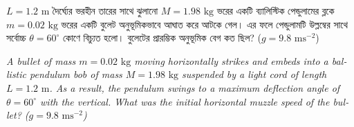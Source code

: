 \documentclass[12pt, a4paper]{article}
\begin{document}
\begin{tcolorbox}[questionbox={প্রশ্ন (Question) 18}]
    \noindent
    $L = 1.2\text{ m}$ দৈর্ঘ্যের ভরহীন তারের সাথে ঝুলানো $M = 1.98\text{ kg}$ ভরের একটি ব্যালিস্টিক পেন্ডুলামের ব্লকে $m = 0.02\text{ kg}$ ভরের একটি বুলেট অনুভূমিকভাবে আঘাত করে আটকে গেল। এর ফলে পেন্ডুলামটি উল্লম্বের সাথে সর্বোচ্চ $\theta = 60^\circ$ কোণে বিচ্যুত হলো। বুলেটের প্রারম্ভিক অনুভূমিক বেগ কত ছিল? ($g = 9.8\text{ ms}^{-2}$)
    
    \vspace{0.8em}
    \begin{english}
    \noindent\textit{\color{darkgray}
    A bullet of mass $m = 0.02\text{ kg}$ moving horizontally strikes and embeds into a ballistic pendulum bob of mass $M = 1.98\text{ kg}$ suspended by a light cord of length $L = 1.2\text{ m}$. As a result, the pendulum swings to a maximum deflection angle of $\theta = 60^\circ$ with the vertical. What was the initial horizontal muzzle speed of the bullet? ($g = 9.8\text{ ms}^{-2}$)
    }
    \end{english}
\end{tcolorbox}

\vspace{1em}
\begin{center}
\end{center}
\vspace{1em}
\end{document}
